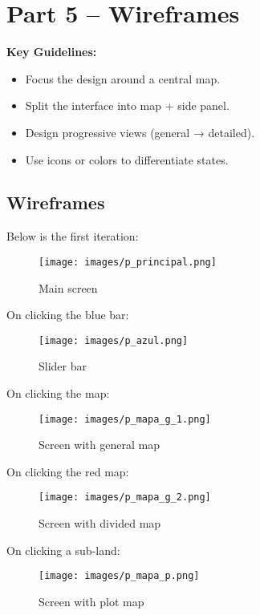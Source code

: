 \documentclass[12pt]{article}
\begin{document}
\section{Part 5 – Wireframes}

\textbf{Key Guidelines:}
\begin{itemize}
  \item Focus the design around a central map.
  \item Split the interface into map + side panel.
  \item Design progressive views (general → detailed).
  \item Use icons or colors to differentiate states.
\end{itemize}

\subsection{Wireframes}

Below is the first iteration:

\begin{figure}[H]
    \centering
    \texttt{[image: images/p\_principal.png]}
    \caption{Main screen}
    \label{fig:enter-label}
\end{figure}

On clicking the blue bar:

\begin{figure}[H]
    \centering
    \texttt{[image: images/p\_azul.png]}
    \caption{Slider bar}
    \label{fig:enter-label}
\end{figure}
\vspace{1 in}
On clicking the map:

\begin{figure}[H]
    \centering
    \texttt{[image: images/p\_mapa\_g\_1.png]}
    \caption{Screen with general map}
    \label{fig:enter-label}
\end{figure}

On clicking the red map:

\begin{figure}[H]
    \centering
    \texttt{[image: images/p\_mapa\_g\_2.png]}
    \caption{Screen with divided map}
    \label{fig:enter-label}
\end{figure}

On clicking a sub-land:

\begin{figure}[H]
    \centering
    \texttt{[image: images/p\_mapa\_p.png]}
    \caption{Screen with plot map}
    \label{fig:enter-label}
\end{figure}
\end{document}
